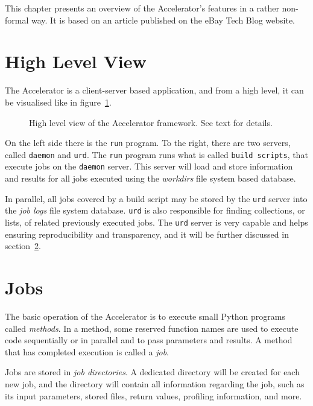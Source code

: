 
This chapter presents an overview of the Accelerator's features in a
rather non-formal way.  It is based on an article published on the
eBay Tech Blog website.



\section{High Level View}

The Accelerator is a client-server based application, and from a high
level, it can be visualised like in figure~\ref{fig:overview}.
\begin{figure}[h!]
  \begin{center}
    
    \caption{High level view of the Accelerator framework.  See text
      for details.}
    \label{fig:overview}
  \end{center}
\end{figure}

On the left side there is the \texttt{run} program.  To the right, there
are two servers, called \texttt{daemon} and \texttt{urd}.  The
\texttt{run} program runs what is called \texttt{build scripts}, that
execute jobs on the \texttt{daemon} server.  This server will load and
store information and results for all jobs executed using the
\textsl{workdirs} file system based database.

In parallel, all jobs covered by a build script may be stored by the
\texttt{urd} server into the \textsl{job logs} file system database.
\texttt{urd} is also responsible for finding collections, or lists, of
related previously executed jobs.  The \texttt{urd} server is very
capable and helps ensuring reproducibility and transparency, and it
will be further discussed in section~\ref{}.


\section{Jobs}
The basic operation of the Accelerator is to execute small Python
programs called \textsl{methods}.  In a method, some reserved function
names are used to execute code sequentially or in parallel and to pass
parameters and results.  A method that has completed execution is
called a \textsl{job}.

Jobs are stored in \textsl{job directories}.  A dedicated directory
will be created for each new job, and the directory will contain all
information regarding the job, such as its input parameters, stored
files, return values, profiling information, and more.

